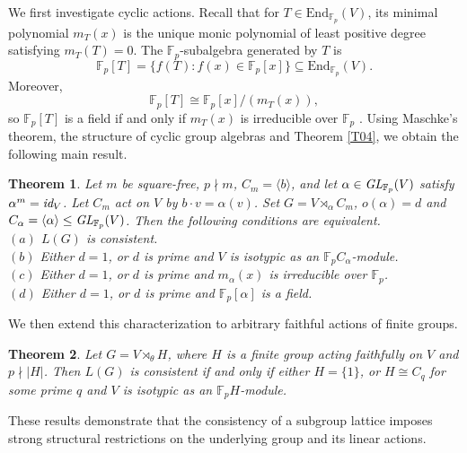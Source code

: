 \documentclass[12pt]{article}
\newtheorem{theorem}{\bf Theorem}[section]
\begin{document}
We first investigate cyclic actions. Recall that for $T\in \mbox{End}_{\mathbb{F}_{p}}(V)$, its minimal polynomial $m_T(x)$ is the unique monic polynomial of least positive degree satisfying $m_{T}(T)=0$. 
The $\mathbb{F}_{p}$-subalgebra generated by $T$ is $$\mathbb{F}_{p}[T]=\{f(T):f(x)\in \mathbb{F}_{p}[x]\}\subseteq \mbox{End}_{\mathbb{F}_{p}}(V).$$
Moreover, $$\mathbb{F}_{p}[T]\cong \mathbb{F}_{p}[x]/(m_{T}(x)),$$ so $\mathbb{F}_{p}[T]$ is a field if and only if $m_T(x)$ is irreducible over $\mathbb{F}_{p}$ \cite{Axler}. 
Using Maschke's theorem, the structure of cyclic group algebras and Theorem \ref{T04}, we obtain the following main result.
\begin{theorem}\label{T001}
Let $m$ be square-free, $p \nmid m$, $C_m =\langle b \rangle$, and let $\alpha\in \emph{GL}_{\mathbb F_p}(V)$ satisfy $\alpha^m=\emph{id}_V$. Let $C_m$ act on $V$ 
by $b\cdot v=\alpha(v)$.
Set $G=V\rtimes_{\alpha} C_m$, $o(\alpha)=d$ and $C_\alpha=\langle \alpha \rangle\leq \emph{GL}_{\mathbb F_p}(V)$. Then the following conditions are equivalent.\\
$(a)$ $L(G)$ is consistent.\\
$(b)$ Either $d=1$, or $d$ is prime and $V$ is isotypic as an $\mathbb F_pC_{\alpha}$-module.\\ 
$(c)$ Either $d=1$, or $d$ is prime and $m_{\alpha}(x)$  is irreducible over $\mathbb{F}_p$.\\
$(d)$ Either $d=1$, or $d$ is prime 
and $\mathbb{F}_p[\alpha]$ is a field.
\end{theorem}
We then extend this characterization to arbitrary 
faithful actions of finite groups.

\begin{theorem}\label{TH4.3}
Let $G=V\rtimes_{\theta} H$, where $H$ is a finite group acting faithfully on $V$ and $p\nmid |H|$. Then $L(G)$ is consistent if and only if either $H=\{1\}$, or $H\cong C_q$ for some prime $q$ and $V$ is isotypic as an $\mathbb{F}_pH$-module.
\end{theorem}
These results demonstrate that the consistency of a subgroup lattice imposes strong structural restrictions on the underlying group and its linear actions.
\end{document}
